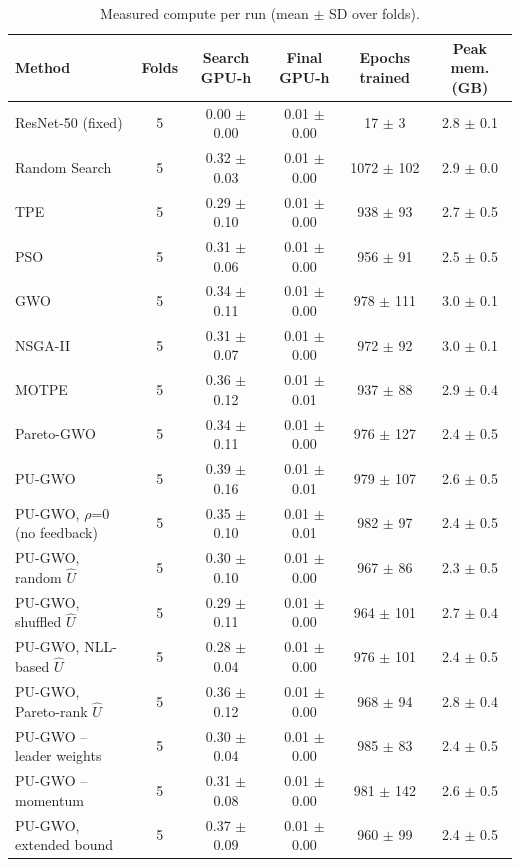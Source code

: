\begin{table}[t]
\centering
\caption{Measured compute per run (mean $\pm$ SD over folds).}
\label{tab:table9_compute_cost}
\small
\begin{tabular}{lccccc}
\toprule
Method & Folds & Search GPU-h & Final GPU-h & Epochs trained & Peak mem. (GB) \\
\midrule
ResNet-50 (fixed) & 5 & 0.00 $\pm$ 0.00 & 0.01 $\pm$ 0.00 & 17 $\pm$ 3 & 2.8 $\pm$ 0.1 \\
Random Search & 5 & 0.32 $\pm$ 0.03 & 0.01 $\pm$ 0.00 & 1072 $\pm$ 102 & 2.9 $\pm$ 0.0 \\
TPE & 5 & 0.29 $\pm$ 0.10 & 0.01 $\pm$ 0.00 & 938 $\pm$ 93 & 2.7 $\pm$ 0.5 \\
PSO & 5 & 0.31 $\pm$ 0.06 & 0.01 $\pm$ 0.00 & 956 $\pm$ 91 & 2.5 $\pm$ 0.5 \\
GWO & 5 & 0.34 $\pm$ 0.11 & 0.01 $\pm$ 0.00 & 978 $\pm$ 111 & 3.0 $\pm$ 0.1 \\
NSGA-II & 5 & 0.31 $\pm$ 0.07 & 0.01 $\pm$ 0.00 & 972 $\pm$ 92 & 3.0 $\pm$ 0.1 \\
MOTPE & 5 & 0.36 $\pm$ 0.12 & 0.01 $\pm$ 0.01 & 937 $\pm$ 88 & 2.9 $\pm$ 0.4 \\
Pareto-GWO & 5 & 0.34 $\pm$ 0.11 & 0.01 $\pm$ 0.00 & 976 $\pm$ 127 & 2.4 $\pm$ 0.5 \\
PU-GWO & 5 & 0.39 $\pm$ 0.16 & 0.01 $\pm$ 0.01 & 979 $\pm$ 107 & 2.6 $\pm$ 0.5 \\
PU-GWO, $\rho$=0 (no feedback) & 5 & 0.35 $\pm$ 0.10 & 0.01 $\pm$ 0.01 & 982 $\pm$ 97 & 2.4 $\pm$ 0.5 \\
PU-GWO, random $\hat{U}$ & 5 & 0.30 $\pm$ 0.10 & 0.01 $\pm$ 0.00 & 967 $\pm$ 86 & 2.3 $\pm$ 0.5 \\
PU-GWO, shuffled $\hat{U}$ & 5 & 0.29 $\pm$ 0.11 & 0.01 $\pm$ 0.00 & 964 $\pm$ 101 & 2.7 $\pm$ 0.4 \\
PU-GWO, NLL-based $\hat{U}$ & 5 & 0.28 $\pm$ 0.04 & 0.01 $\pm$ 0.00 & 976 $\pm$ 101 & 2.4 $\pm$ 0.5 \\
PU-GWO, Pareto-rank $\hat{U}$ & 5 & 0.36 $\pm$ 0.12 & 0.01 $\pm$ 0.00 & 968 $\pm$ 94 & 2.8 $\pm$ 0.4 \\
PU-GWO -- leader weights & 5 & 0.30 $\pm$ 0.04 & 0.01 $\pm$ 0.00 & 985 $\pm$ 83 & 2.4 $\pm$ 0.5 \\
PU-GWO -- momentum & 5 & 0.31 $\pm$ 0.08 & 0.01 $\pm$ 0.00 & 981 $\pm$ 142 & 2.6 $\pm$ 0.5 \\
PU-GWO, extended bound & 5 & 0.37 $\pm$ 0.09 & 0.01 $\pm$ 0.00 & 960 $\pm$ 99 & 2.4 $\pm$ 0.5 \\
\bottomrule
\end{tabular}
\end{table}
